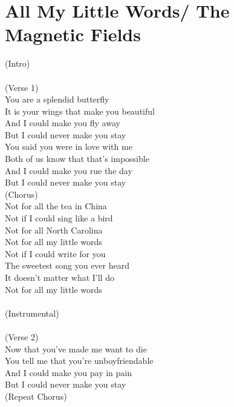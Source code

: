 \section{All My Little Words/ The Magnetic Fields}\label{sec:allmylittlewords}
\Gmajor
\Eminor
\DmajorEasy
\Cmajor


(Intro)\\
    \\
(Verse 1)\\
You are a splendid butterfly\\
It is your wings that make you beautiful\\
And I could make you fly away\\
But I could never make you stay\\
You said you were in love with me\\
Both of us know that that's impossible\\
And I could make you rue the day\\
But I could never make you stay\\
(Chorus)\\
Not for all the tea in China \\
Not if I could sing like a bird\\
Not for all North Carolina \\
Not for all my little words\\
Not if I could write for you\\
The sweetest song you ever heard\\
It doesn't matter what I'll do\\
Not for all my little words\\
\\
(Instrumental)\\
    \\
(Verse 2)\\
Now that you've made me want to die\\
You tell me that you're unboyfriendable\\
And I could make you pay in pain\\
But I could never make you stay\\
(Repeat Chorus)

